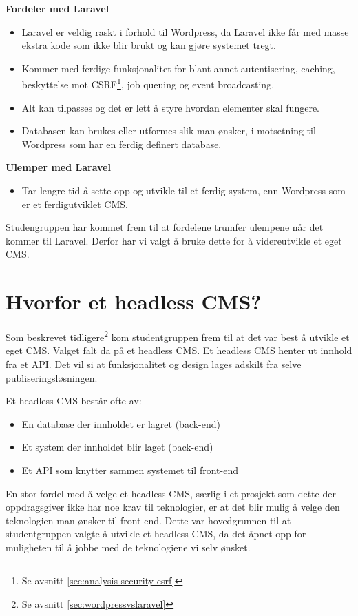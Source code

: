 \textbf{Fordeler med Laravel}
\begin{itemize}
    \item Laravel er veldig raskt i forhold til Wordpress, da Laravel ikke får med masse ekstra kode som ikke blir brukt og kan gjøre systemet tregt.
    \item Kommer med ferdige funksjonalitet for blant annet autentisering, caching, beskyttelse mot CSRF\footnote{Se avsnitt \ref{sec:analysis-security-csrf}}, job queuing og event broadcasting.
    \item Alt kan tilpasses og det er lett å styre hvordan elementer skal fungere.
    \item Databasen kan brukes eller utformes slik man ønsker, i motsetning til Wordpress som har en ferdig definert database.
\end{itemize}

\textbf{Ulemper med Laravel}
\begin{itemize}
    \item Tar lengre tid å sette opp og utvikle til et ferdig system, enn Wordpress som er et ferdigutviklet CMS.
\end{itemize}

Studengruppen har kommet frem til at fordelene trumfer ulempene når det kommer til Laravel. Derfor har vi valgt å bruke dette for å videreutvikle et eget CMS.


\section{Hvorfor et headless CMS?}
Som beskrevet tidligere\footnote{Se avsnitt \ref{sec:wordpressvslaravel}} kom studentgruppen frem til at det var best å utvikle et eget CMS. Valget falt da på et headless CMS. Et headless CMS henter ut innhold fra et API. Det vil si at funksjonalitet og design lages adskilt fra selve publiseringsløsningen.

Et headless CMS består ofte av:
\begin{itemize}
\item En database der innholdet er lagret (back-end)
\item Et system der innholdet blir laget (back-end)
\item Et API som knytter sammen systemet til front-end
\end{itemize}

En stor fordel med å velge et headless CMS, særlig i et prosjekt som dette der oppdragsgiver ikke har noe krav til teknologier, er at det blir mulig å velge den teknologien man ønsker til front-end. Dette var hovedgrunnen til at studentgruppen valgte å utvikle et headless CMS, da det åpnet opp for muligheten til å jobbe med de teknologiene vi selv ønsket.

